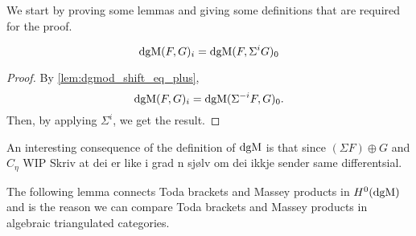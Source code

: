 We start by proving some lemmas and giving some definitions that are required for the proof.

\begin{corollary}
    \label{cor:dgm_i_eq_dgm_0_shifted_codomain}
    \[
        \operatorname{dgM}(F, G)_i = \operatorname{dgM}(F, \Sigma^i G)_0
    \]
\end{corollary}
\begin{proof}
    By \autoref{lem:dgmod_shift_eq_plus},
    \[
        \operatorname{dgM}(F, G)_i = \operatorname{dgM}(\Sigma^{-i} F, G)_0.
    \]
    Then, by applying \( \Sigma^i \), we get the result.
\end{proof}

\begin{remark}
    An interesting consequence of the definition of \( \operatorname{dgM} \) is that since \( (\Sigma F) \oplus G \) and \( C_{\eta} \) WIP Skriv at dei er like i grad n sjølv om dei ikkje sender same differentsial.
\end{remark}

The following lemma connects Toda brackets and Massey products in \( H^0(\operatorname{dgM}) \) and is the reason we can compare Toda brackets and Massey products in algebraic triangulated categories.

